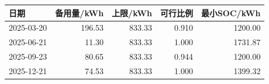 \begin{tabular}{lrrrr}
\toprule
日期 & 备用量/kWh & 上限/kWh & 可行比例 & 最小SOC/kWh \\
\midrule
2025-03-20 & 196.53 & 833.33 & 0.910 & 1200.00 \\
2025-06-21 & 11.30 & 833.33 & 1.000 & 1731.87 \\
2025-09-23 & 80.65 & 833.33 & 0.944 & 1200.00 \\
2025-12-21 & 74.53 & 833.33 & 1.000 & 1399.32 \\
\bottomrule
\end{tabular}
